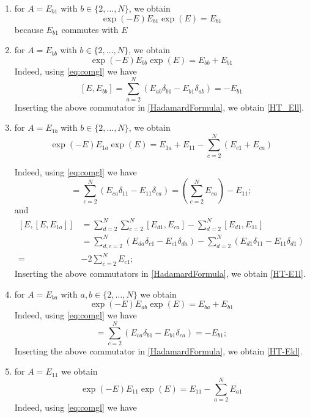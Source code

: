 \documentclass[11pt]{article}
\numberwithin{equation}{section}
\numberwithin{equation}{subsection}
\newcommand{\com}[1]{{ (* {\color{red}\small #1}*)}}
\begin{document}
\begin{enumerate}
    \item for $A=E_{b 1}$ with $b\in \{2,\ldots,N\}$, we obtain 
    \begin{equation}\label{HT_El1}
        \exp{(-E)}E_{b 1}\exp{(E)}=E_{b 1}
    \end{equation}
    because $E_{b 1}$ commutes with $E$
    \item for $A=E_{bb}$ with $b \in \{2,\ldots,N\}$, we obtain 
    \begin{equation}\label{HT_Ell}
        \exp{(-E)}E_{b b}\exp{(E)}=E_{b b}+E_{b 1}
    \end{equation}
Indeed, using \eqref{eq:comgl} we have 
    \begin{equation}
       \left[E, E_{bb}\right]=\sum_{a=2}^{N}\left(E_{ab}\delta_{b 1}-E_{b 1}\delta_{ab}\right)=-E_{b1}
    \end{equation}
    Inserting the above commutator in \eqref{HadamardFormula}, we obtain \eqref{HT_Ell}.
    \item for $A=E_{1b}$ with $b\in \{2,\ldots,N\}$, we obtain 
    \begin{equation}\label{HT-E1l}
        \exp{(-E)}E_{1 a}\exp{(E)}=E_{1a}+E_{11}-\sum_{c=2}^{N}\left(E_{c1}+E_{ca}\right)
    \end{equation}
    
    Indeed, using \eqref{eq:comgl} we have 
    \begin{equation}
[E,E_{1a}]=\sum_{c=2}^{N}\left(E_{ca}\delta_{11}-E_{11}\delta_{ca}\right)= (\sum_{c=2}^{N}E_{ca} ) -E_{11};
\end{equation}
and 
\begin{equation}
\begin{split}
\left[E,[E,E_{1a}]\right]&=\sum_{d=2}^{N}\sum_{c=2}^{N}\left[E_{d1},E_{ca}\right]-\sum_{d=2}^{N}\left[E_{d1},E_{11}\right]
\\&=
\sum_{d,c=2}^{N}\left(E_{da}\delta_{c1}-E_{c1}\delta_{da}\right)-\sum_{d=2}^{N}\left(E_{d1}\delta_{11}-E_{11}\delta_{d1}\right)
\\=&
-2\sum_{c=2}^{N}E_{c1};
\end{split}
\end{equation}
Inserting the above commutators in \eqref{HadamardFormula}, we obtain \eqref{HT-E1l}.
\item for $A=E_{ba}$ with $a,b \in \{2,\ldots,N\}$ we obtain 
\begin{equation}\label{HT-Ekl}
    \exp{(-E)}E_{a b}\exp{(E)}=E_{ba}+E_{b1}
\end{equation}
   Indeed, using \eqref{eq:comgl} we have 
\begin{equation}
[E,E_{ba}]=\sum_{c=2}^{N}\left(E_{ca}\delta_{b1}-E_{b1}\delta_{c a}\right)=-E_{b1};
\end{equation}
Inserting the above commutator in \eqref{HadamardFormula}, we obtain \eqref{HT-Ekl}.
\item for $A=E_{11}$ we obtain 
\begin{equation}\label{HT-E11}
    \exp{(-E)}E_{11}\exp{(E)}=E_{11}-\sum_{a=2}^{N}E_{a1}
\end{equation}
  Indeed, using \eqref{eq:comgl} we have 


\end{enumerate}
\end{document}
